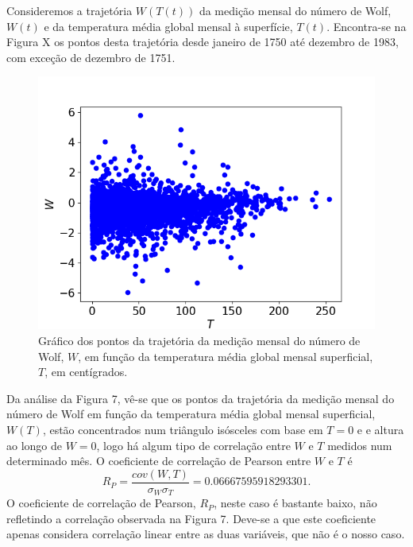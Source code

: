 \documentclass[aps,pre,twocolumn,showpacs,amsmath,amssymb]{revtex4-1}
\begin{document}
Consideremos a trajetória $W(T(t))$ da medição mensal do número de Wolf, $W(t)$ e da temperatura média global mensal à superfície, $T(t)$. Encontra-se na Figura X os pontos desta trajetória desde janeiro de 1750 até dezembro de 1983, com exceção de dezembro de 1751.\\

\begin{figure}[hbt!]
    \centering
    \includegraphics[width=\columnwidth]{wolfandtemperature.png}
    \caption{Gráfico dos pontos da trajetória da medição mensal do número de Wolf, $W$, em função da temperatura média global mensal superficial, $T$, em centígrados.}
\end{figure}
Da análise da Figura 7, vê-se que os pontos da trajetória da medição mensal do número de Wolf em função da temperatura média global mensal superficial, $W(T)$, estão concentrados num triângulo isósceles com base em $T=0$ e e altura ao longo de $W=0$, logo há algum tipo de correlação entre $W$ e $T$ medidos num determinado mês.
O coeficiente de correlação de Pearson entre $W$ e $T$ é
\begin{equation}
    R_P=\frac{cov(W,T)}{\sigma_W \sigma_T}=0.06667595918293301.
\end{equation}
O coeficiente de correlação de Pearson, $R_P$, neste caso é bastante baixo, não refletindo a correlação observada na Figura 7. Deve-se a que este coeficiente apenas considera correlação linear entre as duas variáveis, que não é o nosso caso.
\end{document}
